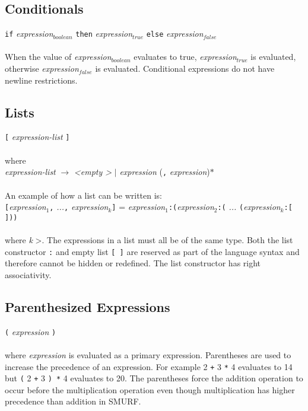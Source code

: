 \subsection{Conditionals}
  \texttt{if} \emph{expression$_{boolean}$} \texttt{then}  \emph{expression$_{true}$} \texttt{else}  \emph{expression$_{false}$} \\ \\
  When the value of \emph{expression$_{boolean}$} evaluates to true, \emph{expression$_{true}$} is evaluated, otherwise  \emph{expression$_{false}$} is evaluated. Conditional expressions do not have newline restrictions.

\subsection{Lists}
  \texttt{[} \emph{expression-list} \texttt{]} \\ \\
  where \\
  
  \emph{expression-list} $\rightarrow$  
  \emph{\textless empty \textgreater} $|$
  \emph{expression} (\texttt{,} \emph{expression})$*$  \\ \\
An example of how a list can be written is: \\

\texttt{[}\emph{expression$_{1}$}\texttt{,} \emph{...}\texttt{,} \emph{expression$_{k}$}\texttt{]} = 
  \emph{expression$_{1}$}\texttt{:(}\emph{expression$_{2}$}\texttt{:(} \emph{...} \texttt{(}\emph{expression$_{k}$}\texttt{:[ ]))} \\ \\
where \textit{k} \textgreater{}. The expressions in a list must all be of the same type. Both the list constructor \texttt{:} and empty list \texttt{[ ]} are reserved as part of the language syntax and therefore cannot be hidden or redefined. The list constructor has right associativity.

\subsection{Parenthesized Expressions}
  \texttt{(} \emph{expression} \texttt{)} \\ \\
  where \emph{expression} is evaluated as a primary expression. Parentheses are used to increase the precedence of an expression. For example 2 \texttt{+} 3 \texttt{*}  4  evaluates to 14 but \texttt{(} 2 \texttt{+} 3 \texttt{) *}  4 evaluates to 20. The parentheses force the addition operation to occur before the multiplication operation even though multiplication has higher precedence than addition in SMURF.


